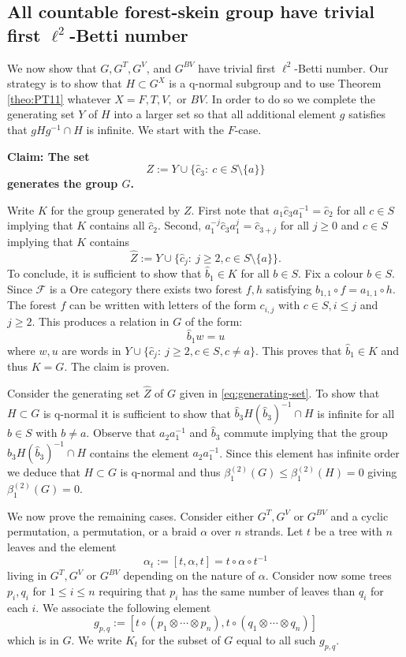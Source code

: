 \documentclass[a4paper, 12pt]{amsart}
\numberwithin{equation}{section}
\theoremstyle{definition}
\newcommand{\betti}{\beta^{(2)}_1}
\newcommand{\cF}{\mathcal F}
\newcommand{\ot}{\otimes}
\newcommand{\wh}{\widehat}
\begin{document}
\subsection{All countable forest-skein group have trivial first $\ell^2$-Betti number}
We now show that $G,G^T,G^V$, and $G^{BV}$ have trivial first $\ell^2$-Betti number.
Our strategy is to show that $H\subset G^X$ is a q-normal subgroup and to use Theorem \ref{theo:PT11} whatever $X=F,T,V,$ or $BV$.
In order to do so we complete the generating set $Y$ of $H$ into a larger set so that all additional element $g$ satisfies that $gHg^{-1}\cap H$ is infinite.
We start with the $F$-case.

{\bf Claim: The set 
\begin{equation}\label{eq:generating-set}
Z:=Y\cup \{\hat c_3:\ c\in S\setminus\{a\}\}
\end{equation}
generates the group $G$.}

Write $K$ for the group generated by $Z$.
First note that $a_1\hat c_3 a_1^{-1} = \hat c_2$ for all $c\in S$ implying that $K$ contains all $\hat c_2.$
Second, $a_1^{-j} \hat c_3 a_1^j = \hat c_{3+j}$ for all $j\geq 0$ and $c\in S$ implying that $K$ contains 
$$\wh Z:= Y\cup \{\hat c_j:\ j\geq 2, c\in S\setminus\{a\}\}.$$
To conclude, it is sufficient to show that $\hat b_1\in K$ for all $b\in S$.
Fix a colour $b\in S$.
Since $\cF$ is a Ore category there exists two forest $f,h$ satisfying $b_{1,1}\circ f = a_{1,1}\circ h$.
The forest $f$ can be written with letters of the form $c_{i,j}$ with $c\in S,i\leq j$ and $j\geq 2.$
This produces a relation in $G$ of the form:
$$\hat b_1 w= u$$
where $w,u$ are words in $Y\cup\{ \hat c_j:\ j\geq 2, c\in S, c\neq a\}$.
This proves that $\hat b_1\in K$ and thus $K=G$.
The claim is proven.

Consider the generating set $\wh Z$ of $G$ given in \eqref{eq:generating-set}.
To show that $H\subset G$ is q-normal it is sufficient to show that $\hat b_3 H (\hat b_3)^{-1} \cap H$ is infinite for all $b\in S$ with $b\neq a$.
Observe that $a_2a_1^{-1}$ and $\hat b_3$ commute implying that the group $\hat b_3 H (\hat b_3)^{-1} \cap H$ contains the element $a_2a_1^{-1}$. 
Since this element has infinite order we deduce that $H\subset G$ is q-normal and thus $\betti(G)\leq \betti(H)=0$ giving $\betti(G)=0$.

We now prove the remaining cases.
Consider either $G^T,G^V$ or $G^{BV}$ and a cyclic permutation, a permutation, or a braid $\alpha$ over $n$ strands.
Let $t$ be a tree with $n$ leaves and the element 
$$\alpha_t:=[t,\alpha,t] = t\circ \alpha\circ t^{-1}$$ 
living in $G^T,G^V$ or $G^{BV}$ depending on the nature of $\alpha$.
Consider now some trees $p_i,q_i$ for $1\leq i\leq n$ requiring that $p_i$ has the same number of leaves than $q_i$ for each $i$. 
We associate the following element 
$$g_{p,q}:= [ t\circ (p_1\ot \cdots \ot p_n), t\circ (q_1\ot \cdots\ot q_n)]$$ which is in $G$.
We write $K_t$ for the subset of $G$ equal to all such $g_{p,q}$.
\end{document}
